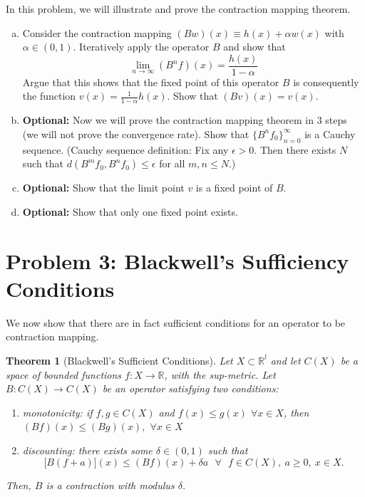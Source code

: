 \documentclass[11pt]{extarticle}
\theoremstyle{plain}
\newtheorem{thm}{Theorem}
\theoremstyle{definition}
\begin{document}
\vspace{5mm}
\noindent
In this problem, we will illustrate and prove the contraction mapping theorem.

\begin{enumerate}[(a)]
\item Consider the contraction mapping $(Bw)(x) \equiv h(x) + \alpha w(x)$ with $\alpha \in (0, 1)$. Iteratively apply the operator $B$ and show that 
\begin{equation*}
	\lim_{n \to \infty} (B^n f)(x) = \frac{h(x)}{1-\alpha}
\end{equation*}
Argue that this shows that the fixed point of this operator $B$ is consequently the function $v(x) = \frac{1}{1-\alpha} h(x)$. Show that $(Bv)(x) = v(x)$. 

\item \textbf{Optional:} Now we will prove the contraction mapping theorem in 3 steps (we will not prove the convergence rate). Show that $\{ B^n f_0\}_{n=0}^\infty$ is a Cauchy sequence. (Cauchy sequence definition: Fix any $\epsilon > 0$. Then there exists $N$ such that $d(B^m f_0, B^n f_0) \leq \epsilon$ for all $m, n \leq N$.) 

\item \textbf{Optional:} Show that the limit point $v$ is a fixed point of $B$. 

\item \textbf{Optional:} Show that only one fixed point exists. 

\end{enumerate}


\vspace{5mm}
\section*{Problem 3: Blackwell's Sufficiency Conditions}

We now show that there are in fact sufficient conditions for an operator to be contraction mapping.

\begin{thm}[Blackwell's Sufficient Conditions]
	
	Let $X \subset \mathbb R^l$ and let $C(X)$ be a space of bounded functions $f:X \to \mathbb R$, with the sup-metric. Let $B : C(X) \to C(X)$ be an operator satisfying two conditions:
	\begin{enumerate}[1.]
		\item monotonicity: if $f,g\in C(X)$ and $f(x)\leq g(x)$ $\forall x\in X$,%
		\newline
		then $(Bf)(x)\leq (Bg)(x),$ $\forall x\in X$\newline
		
		\item discounting: there exists some $\delta \in (0,1)$ such that 
		\[
		\lbrack B(f+a)](x)\leq (Bf)(x)+\delta a\text{ \ }\forall \text{ }f\in C(X),\
		a\geq 0,\ x\in X. 
		\]%
	\end{enumerate}
	
	\noindent
	Then, $B$ is a contraction with modulus $\delta$.

\end{thm}
\end{document}
